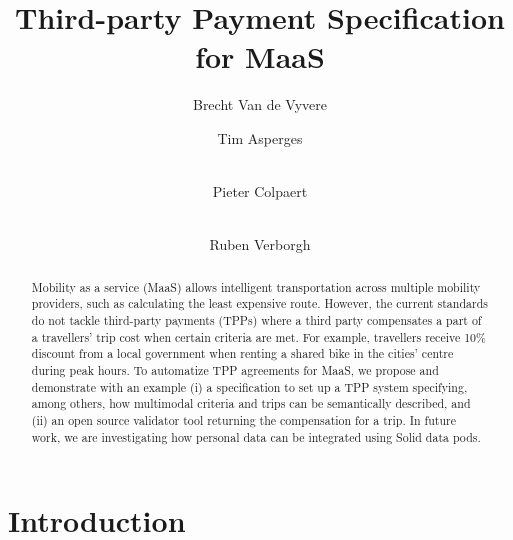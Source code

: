 \documentclass[runningheads]{llncs}
\begin{document}
%
\title{Third-party Payment Specification for MaaS}
%
%
\author{Brecht Van de Vyvere \and
Tim Asperges \and \\
Pieter Colpaert \and \\
Ruben Verborgh}
%
%
%


\maketitle              %
%
\begin{abstract}
Mobility as a service (MaaS) allows intelligent transportation across multiple mobility providers, such as calculating the least expensive route. However, the current standards do not tackle third-party payments (TPPs) where a third party compensates a part of a travellers’ trip cost when certain criteria are met. For example, travellers receive 10\% discount from a local government when renting a shared bike in the cities' centre during peak hours. To automatize TPP agreements for MaaS, we propose and demonstrate with an example (i) a specification to set up a TPP system specifying, among others, how multimodal criteria and trips can be semantically described, and (ii) an open source validator tool returning the compensation for a trip. In future work, we are investigating how personal data can be integrated using Solid data pods.

\end{abstract}
%
%
%
\section{Introduction}
\end{document}
